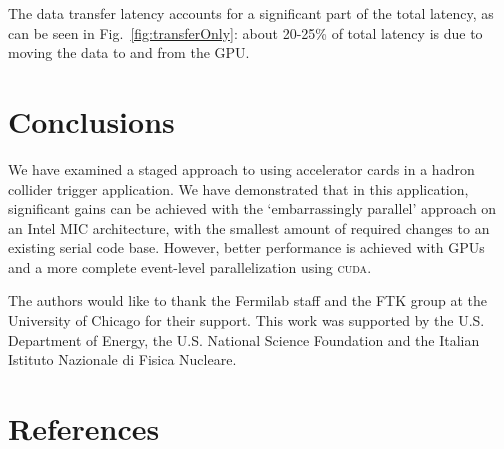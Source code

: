 \documentclass[a4]{jpconf}
\begin{document}
The data transfer latency accounts for a significant part of the total
latency, as can be seen in Fig.~\ref{fig:transferOnly}: about 20-25\%
of total latency is due to moving the data to and from the GPU.


\section{Conclusions}
We have examined a staged approach to using accelerator cards in a
hadron collider trigger application. We have demonstrated that in this
application, significant gains can be achieved with the
`embarrassingly parallel' approach on an Intel MIC
architecture, with the smallest amount of required changes to an
existing serial code base. However, better performance is achieved
with GPUs and a more complete event-level parallelization using
\textsc{cuda}. 

\ack
The authors would like to thank the Fermilab staff and the FTK group at the 
University of Chicago for their support. This work was supported by the
U.S. Department of Energy, the U.S. National Science Foundation and the Italian
Istituto Nazionale di Fisica Nucleare. 

\section*{References}







 
\end{document}
